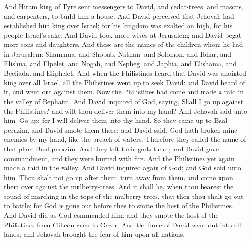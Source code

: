 And Hiram king of Tyre sent messengers to David, and cedar-trees, and masons, and carpenters, to build him a house. And David perceived that Jehovah had established him king over Israel; for his kingdom was exalted on high, for his people Israel’s sake.  And David took more wives at Jerusalem; and David begat more sons and daughters. And these are the names of the children whom he had in Jerusalem: Shammua, and Shobab, Nathan, and Solomon, and Ibhar, and Elishua, and Elpelet, and Nogah, and Nepheg, and Japhia, and Elishama, and Beeliada, and Eliphelet.  And when the Philistines heard that David was anointed king over all Israel, all the Philistines went up to seek David: and David heard of it, and went out against them. Now the Philistines had come and made a raid in the valley of Rephaim. And David inquired of God, saying, Shall I go up against the Philistines? and wilt thou deliver them into my hand? And Jehovah said unto him, Go up; for I will deliver them into thy hand. So they came up to Baal-perazim, and David smote them there; and David said, God hath broken mine enemies by my hand, like the breach of waters. Therefore they called the name of that place Baal-perazim. And they left their gods there; and David gave commandment, and they were burned with fire.  And the Philistines yet again made a raid in the valley. And David inquired again of God; and God said unto him, Thou shalt not go up after them: turn away from them, and come upon them over against the mulberry-trees. And it shall be, when thou hearest the sound of marching in the tops of the mulberry-trees, that then thou shalt go out to battle; for God is gone out before thee to smite the host of the Philistines. And David did as God commanded him: and they smote the host of the Philistines from Gibeon even to Gezer. And the fame of David went out into all lands; and Jehovah brought the fear of him upon all nations. 

